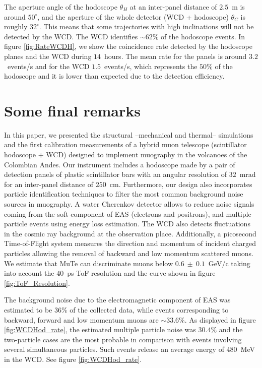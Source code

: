 \documentclass[letterpaper,11pt]{article}
\begin{document}
The aperture angle of the hodoscope $\theta_H$ at an inter-panel distance of $2.5$~m is around $50^{\circ}$, and the aperture of the whole detector (WCD + hodoscope) $\theta_C$ is roughly $32^{\circ}$. This means that some trajectories with high inclinations will not be detected by the WCD. The WCD identifies $\sim 62\%$ of the hodoscope events. In figure \ref{fig:RateWCDH}, we show the coincidence rate detected by the hodoscope planes and the WCD during $14$~hours. The mean rate for the panels is around $3.2$~events/s and for the WCD $1.5$~events/s, which represents the $50\%$ of the hodoscope and it is lower than expected due to the detection efficiency.


\section{Some final remarks}
\label{conclusions}
In this paper, we presented the structural --mechanical and thermal-- simulations and the first calibration measurements of a hybrid muon telescope (scintillator hodoscope + WCD) designed to implement muography in the volcanoes of the Colombian Andes. Our instrument includes a hodoscope made by a pair of detection panels of plastic scintillator bars with an angular resolution of $32$~mrad for an inter-panel distance of $250$~cm. Furthermore, our design also incorporates particle identification techniques to filter the most common background noise sources in muography. A water Cherenkov detector allows to reduce noise signals coming from the soft-component of EAS (electrons and positrons), and multiple particle events using energy loss estimation. The WCD also detects fluctuations in the cosmic ray background at the observation place. Additionally, a picosecond Time-of-Flight system measures the direction and momentum of incident charged particles allowing the removal of backward and low momentum scattered muons. We estimate that MuTe can discriminate muons below  $0.6~\pm~0.1$~GeV/c taking into account the $40$~ps ToF resolution and the curve shown in figure \ref{fig:ToF_Resolution}.

 The background noise due to the electromagnetic component of EAS was estimated to be $36\%$ of the collected data, while events corresponding to backward, forward and low momentum muons are $\sim 33.6\%$. As displayed in figure \ref{fig:WCDHod_rate}, the estimated multiple particle noise was $30.4\%$ and the two-particle cases are the most probable in comparison with events involving several simultaneous particles. Such events release an average energy of $480$~MeV in the WCD. See figure \ref{fig:WCDHod_rate}.
\end{document}
